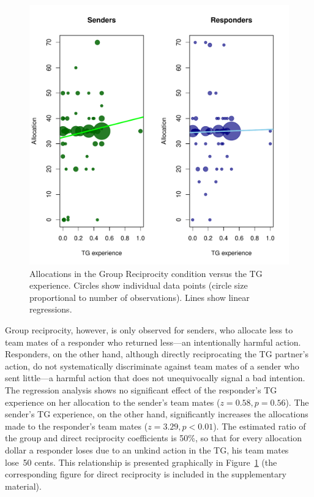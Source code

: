 \documentclass[12pt,a4paper]{article}\usepackage[]{graphicx}\usepackage[]{color}
\makeatletter
\def\maxwidth{ %
  \ifdim\Gin@nat@width>\linewidth
    \linewidth
  \else
    \Gin@nat@width
  \fi
}
\newenvironment{knitrout}{}{} %
\makeatother
\begin{document}
\begin{knitrout}
\color{fgcolor}\begin{figure}
\includegraphics[width=\maxwidth]{figure/plots-1} \caption[Allocations in the Group Reciprocity condition versus the TG experience]{Allocations in the Group Reciprocity condition versus the TG experience. Circles show individual data points (circle size proportional to number of observations). Lines show linear regressions.}\label{fig:plots}
\end{figure}


\end{knitrout}


Group reciprocity, however, is only observed for senders, who allocate
less to team mates of a responder who returned less---an intentionally harmful action.
Responders, on the other hand, although directly reciprocating the
TG partner's action, do not systematically discriminate against team mates
of a sender who sent little---a harmful action that does not unequivocally
signal a bad intention. The regression analysis shows no significant
effect of the responder's TG experience on her allocation to the sender's
team mates ($z=0.58,p= 0.56$). 
The sender's TG experience, on the other
hand, significantly increases the allocations made to the responder's team mates 
($z=3.29,p< 0.01$).
The estimated ratio of the group and direct reciprocity coefficients
is 50\%, so that for every allocation dollar a responder
loses due to an unkind action in the TG, his team mates lose~50 cents. 
This relationship is presented graphically in Figure~\ref{fig:plots} (the corresponding figure for direct reciprocity is included in the supplementary material).
\end{document}
